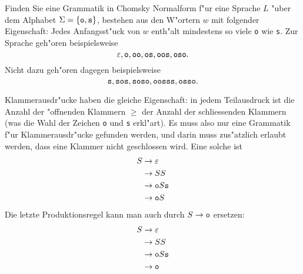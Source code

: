 Finden Sie eine Grammatik in Chomsky Normalform f"ur eine Sprache
$L$ "uber dem Alphabet
$\Sigma=\{\text{\tt o},\text{\tt s}\}$, bestehen aus den W"ortern
$w$ mit folgender Eigenschaft: Jedes Anfangsst"uck von $w$ enth"alt mindestens
so viele {\tt o} wie {\tt s}. Zur Sprache geh"oren beispielsweise
\[
\varepsilon,
\text{\tt o},
\text{\tt oo},
\text{\tt os},
\text{\tt oos},
\text{\tt oso}.
\]
Nicht dazu geh"oren dagegen beispielsweise
\[
\text{\tt s},
\text{\tt sos},
\text{\tt soso},
\text{\tt oosss},
\text{\tt osso}.
\]

\begin{loesung}
Klammerausdr"ucke haben die gleiche Eigenschaft: in jedem Teilausdruck
ist die Anzahl der "offnenden Klammern $\ge$ der Anzahl der schliessenden
Klammern (was die Wahl der Zeichen {\tt o} und {\tt s} erkl"art). Es muss
also nur eine Grammatik f"ur Klammerausdr"ucke gefunden werden, und darin
muss zus"atzlich erlaubt werden, dass eine Klammer nicht geschlossen
wird. Eine solche ist
\begin{align*}
S&\rightarrow \varepsilon\\
 &\rightarrow SS\\
 &\rightarrow {\tt o}S{\tt s}\\
 &\rightarrow {\tt o}S
\end{align*}
Die letzte Produktionsregel kann man auch durch $S\rightarrow{\tt o}$
ersetzen:
\begin{align*}
S&\rightarrow \varepsilon\\
 &\rightarrow SS\\
 &\rightarrow {\tt o}S{\tt s}\\
 &\rightarrow {\tt o}
\end{align*}


\end{loesung}
